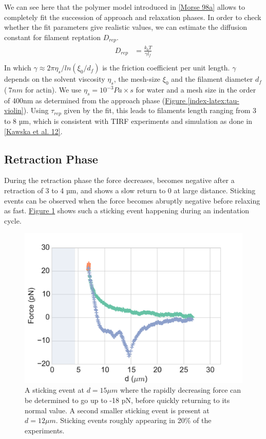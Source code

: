 \documentclass[A4paperpaper,11pt,english]{sphinxmanual}
\begin{document}
We can see here that the polymer model introduced in {\hyperref[index-latex:morse1998a]{{[}Morse 98a{]}}} allows
to completely fit the succession of approach and relaxation phases.  In order to check whether
the fit parameters give realistic values, we can estimate the diffusion constant
for filament reptation \(D_{rep}\).
\label{index-latex:equation-eqa3-10}\begin{gather}
\begin{split}D_{rep} &= \frac{k_bT}{\gamma l_f} \\\end{split}\label{index-latex-eqa3-10}
\end{gather}
In which \(\gamma\approx {2\pi\eta_s}/{ln(\xi_0/d_f)}\) is the friction
coefficient per unit length. \(\gamma\) depends on the solvent viscosity
\(\eta_s\), the mesh-size \(\xi_0\) and the filament diameter
\(d_f\) (\(~7nm\) for actin).  We use \(\eta_s=10^{-3} Pa\times s\)
for water and a mesh size in the order of 400nm as determined from the approach phase
(\hyperref[index-latex:tau-violin]{Figure  \ref*{index-latex:tau-violin}}). Using \(\tau_{rep}\) given by the fit, this leads to filaments
length ranging from 3 to 8 µm, which is consistent with TIRF experiments and simulation as done in {\hyperref[index-latex:kawska2012]{{[}Kawska et al. 12{]}}}.


\subsection{Retraction Phase}
\label{index-latex:retraction-phase}
During the retraction phase the force decreases, becomes negative after a
retraction of 3 to 4 µm, and shows a slow  return to 0 at large distance.
Sticking events can be observed when the force becomes abruptly negative before
relaxing as fast. \hyperref[index-latex:sticking-event]{Figure  \ref*{index-latex:sticking-event}} shows such a sticking event
happening during an indentation cycle.
\begin{figure}[htbp]
\centering
\capstart

\includegraphics[width=0.800\linewidth]{sticking-event.pdf}
\caption{A sticking event at \(d=15\mu{}m\) where the rapidly decreasing force can be determined to go
up to -18 pN, before quickly returning to its normal value. A second smaller
sticking event is present at \(d=12\mu{}m\). Sticking events roughly appearing in 20\% of
the experiments.}\label{index-latex:sticking-event}\end{figure}
\end{document}
